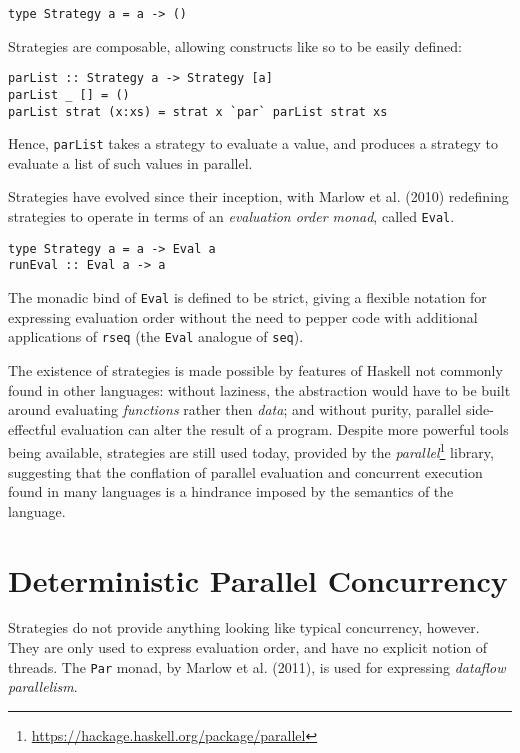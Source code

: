 \begin{verbatim}
type Strategy a = a -> ()
\end{verbatim}

Strategies are composable, allowing constructs like so to be easily
defined:

\begin{verbatim}
parList :: Strategy a -> Strategy [a]
parList _ [] = ()
parList strat (x:xs) = strat x `par` parList strat xs
\end{verbatim}

Hence, \verb|parList| takes a strategy to evaluate a value, and
produces a strategy to evaluate a list of such values in
parallel.

Strategies have evolved since their inception, with Marlow et
al. (2010)\nocite{strategies} redefining strategies to operate in
terms of an \textit{evaluation order monad}, called \verb|Eval|.

\begin{verbatim}
type Strategy a = a -> Eval a
runEval :: Eval a -> a
\end{verbatim}

The monadic bind of \verb|Eval| is defined to be strict, giving a
flexible notation for expressing evaluation order without the need to
pepper code with additional applications of \verb|rseq| (the
\verb|Eval| analogue of \verb|seq|).

The existence of strategies is made possible by features of Haskell
not commonly found in other languages: without laziness, the
abstraction would have to be built around evaluating
\textit{functions} rather then \textit{data}; and without purity,
parallel side-effectful evaluation can alter the result of a
program. Despite more powerful tools being available, strategies are
still used today, provided by the
\textit{parallel}\footnote{\url{https://hackage.haskell.org/package/parallel}}
library, suggesting that the conflation of parallel evaluation and
concurrent execution found in many languages is a hindrance imposed by
the semantics of the language.

\section{Deterministic Parallel Concurrency}
\label{sec:litrev-det}

Strategies do not provide anything looking like typical concurrency,
however. They are only used to express evaluation order, and have no
explicit notion of threads. The \verb|Par| monad, by Marlow et
al. (2011)\nocite{parmonad}, is used for expressing \textit{dataflow
  parallelism}.

